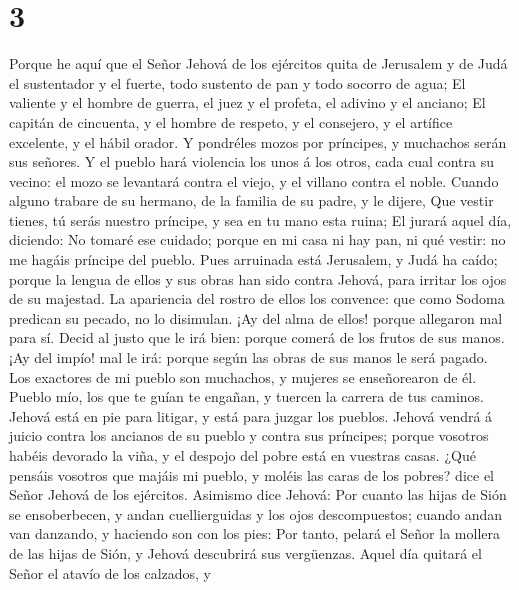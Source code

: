 \hypertarget{section-2}{%
\section{3}\label{section-2}}

 Porque he aquí que el Señor Jehová de los ejércitos quita
de Jerusalem y de Judá el sustentador y el fuerte, todo sustento de pan
y todo socorro de agua;  El valiente y el hombre de guerra,
el juez y el profeta, el adivino y el anciano;  El capitán
de cincuenta, y el hombre de respeto, y el consejero, y el artífice
excelente, y el hábil orador.  Y pondréles mozos por
príncipes, y muchachos serán sus señores.  Y el pueblo hará
violencia los unos á los otros, cada cual contra su vecino: el mozo se
levantará contra el viejo, y el villano contra el noble. 
Cuando alguno trabare de su hermano, de la familia de su padre, y le
dijere, Que vestir tienes, tú serás nuestro príncipe, y sea en tu mano
esta ruina;  El jurará aquel día, diciendo: No tomaré ese
cuidado; porque en mi casa ni hay pan, ni qué vestir: no me hagáis
príncipe del pueblo.  Pues arruinada está Jerusalem, y Judá
ha caído; porque la lengua de ellos y sus obras han sido contra Jehová,
para irritar los ojos de su majestad.  La apariencia del
rostro de ellos los convence: que como Sodoma predican su pecado, no lo
disimulan. ¡Ay del alma de ellos! porque allegaron mal para sí.
 Decid al justo que le irá bien: porque comerá de los
frutos de sus manos.  ¡Ay del impío! mal le irá: porque
según las obras de sus manos le será pagado.  Los exactores
de mi pueblo son muchachos, y mujeres se enseñorearon de él. Pueblo mío,
los que te guían te engañan, y tuercen la carrera de tus caminos.
 Jehová está en pie para litigar, y está para juzgar los
pueblos.  Jehová vendrá á juicio contra los ancianos de su
pueblo y contra sus príncipes; porque vosotros habéis devorado la viña,
y el despojo del pobre está en vuestras casas.  ¿Qué
pensáis vosotros que majáis mi pueblo, y moléis las caras de los pobres?
dice el Señor Jehová de los ejércitos.  Asimismo dice
Jehová: Por cuanto las hijas de Sión se ensoberbecen, y andan
cuellierguidas y los ojos descompuestos; cuando andan van danzando, y
haciendo son con los pies:  Por tanto, pelará el Señor la
mollera de las hijas de Sión, y Jehová descubrirá sus vergüenzas.
 Aquel día quitará el Señor el atavío de los calzados, y
